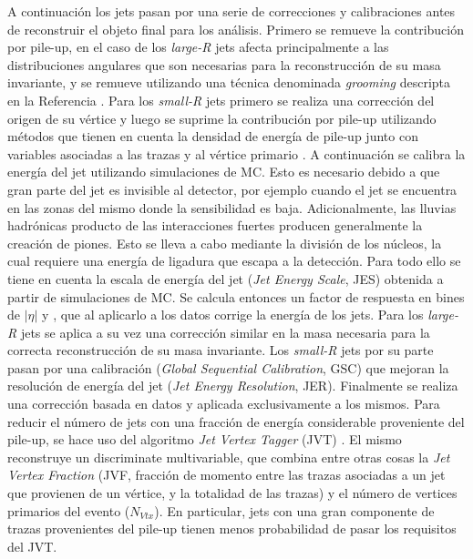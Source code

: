 A continuación los jets pasan por una serie de correcciones y calibraciones antes de reconstruir el objeto final para los análisis. Primero se remueve la contribución por pile-up, en el caso de los \textit{large-R} jets afecta principalmente a las distribuciones angulares que son necesarias para la reconstrucción de su masa invariante, y se remueve utilizando una técnica denominada \textit{grooming} descripta en la Referencia \cite{trimming}. Para los \textit{small-R} jets primero se realiza una corrección del origen de su vértice y luego se suprime la contribución por pile-up utilizando métodos que tienen en cuenta la densidad de energía de pile-up \cite{PERF-2016-04} junto con variables asociadas a las trazas y al vértice primario \cite{PERF-2014-03}.
A continuación se calibra la energía del jet utilizando simulaciones de MC.
Esto es necesario debido a que gran parte del jet es invisible al detector, por ejemplo cuando el jet se encuentra en las zonas del mismo donde la sensibilidad es baja. 
Adicionalmente, las lluvias hadrónicas producto de las interacciones fuertes producen generalmente la creación de piones. Esto se lleva a cabo mediante la división de los núcleos, la cual requiere una energía de ligadura que escapa a la detección. Para todo ello se tiene en cuenta
la escala de energía del jet (\textit{Jet Energy Scale}, JES) \cite{JETM-2018-05} obtenida a partir de simulaciones de MC. Se calcula entonces un factor de respuesta en bines de $|\eta|$ y \pt, que al aplicarlo a los datos corrige la energía de los jets. Para los \textit{large-R} jets se aplica a su vez una corrección similar en la masa necesaria para la correcta reconstrucción de su masa invariante. Los \textit{small-R} jets por su parte pasan por una calibración (\textit{Global Sequential Calibration}, GSC) que mejoran la resolución de energía del jet (\textit{Jet Energy Resolution}, JER). Finalmente se realiza una corrección basada en datos y aplicada exclusivamente a los mismos.
Para reducir el número de jets con una fracción de energía considerable proveniente del pile-up, se hace uso del algoritmo \textit{Jet Vertex Tagger} (JVT) \cite{ATLAS-CONF-2014-018}. El mismo reconstruye un discriminate multivariable, que combina entre otras cosas la \textit{Jet Vertex Fraction} (JVF, fracción de momento entre las trazas asociadas a un jet que provienen de un vértice, y la totalidad de las trazas) y el número de vertices primarios del evento ($N_{Vtx}$). En particular, jets con una gran componente de trazas provenientes del pile-up tienen menos probabilidad de pasar los requisitos del JVT. 




